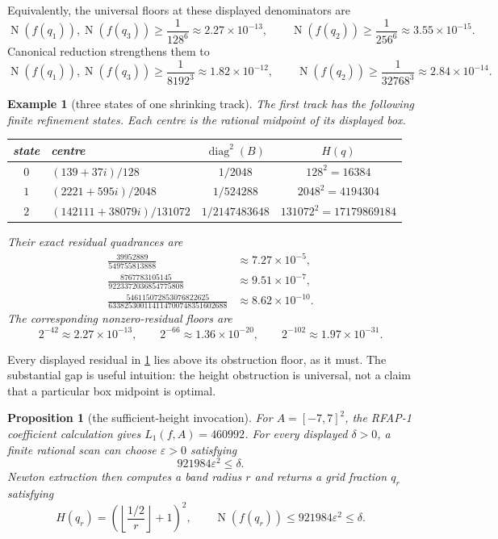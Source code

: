 \documentclass[11pt]{article}
\newtheorem{proposition}[proposition]{Proposition}
\newtheorem{example}[example]{Example}
\newcommand{\Norm}[1]{\operatorname{N}\!\left(#1\right)}
\newcommand{\diamq}{\operatorname{diag}^{2}}
\newcommand{\eps}{\varepsilon}
\begin{document}
Equivalently, the universal floors at these displayed denominators are
\[
 \Norm{f(q_1)},\Norm{f(q_3)}\ge\frac1{128^6}
       \approx2.27\mathbin{\times}10^{-13},
 \qquad
 \Norm{f(q_2)}\ge\frac1{256^6}
       \approx3.55\mathbin{\times}10^{-15}.
\]
Canonical reduction strengthens them to
\[
 \Norm{f(q_1)},\Norm{f(q_3)}\ge\frac1{8192^3}
       \approx1.82\mathbin{\times}10^{-12},
 \qquad
 \Norm{f(q_2)}\ge\frac1{32768^3}
       \approx2.84\mathbin{\times}10^{-14}.
\]

\begin{example}[three states of one shrinking track]
\label{ex:cubic-track}
The first track has the following finite refinement states.  Each centre is
the rational midpoint of its displayed box.

\begin{center}
\small
\begin{tabularx}{\textwidth}{@{}c>{\raggedright\arraybackslash}Xcc@{}}
\toprule
state & centre & $\diamq(B)$ & $H(q)$\\
\midrule
$0$ & $(139+37i)/128$
    & $1/2048$ & $128^2=16384$\\
$1$ & $(2221+595i)/2048$
    & $1/524288$ & $2048^2=4194304$\\
$2$ & $(142111+38079i)/131072$
    & $1/2147483648$ & $131072^2=17179869184$\\
\bottomrule
\end{tabularx}
\end{center}

Their exact residual quadrances are
\[
 \begin{aligned}
 \frac{39952889}{549755813888}
   &\approx7.27\mathbin{\times}10^{-5},\\
 \frac{8767783105145}{9223372036854775808}
   &\approx9.51\mathbin{\times}10^{-7},\\
 \frac{546115072853076822625}{633825300114114700748351602688}
   &\approx8.62\mathbin{\times}10^{-10}.
 \end{aligned}
\]
The corresponding nonzero-residual floors are
\[
 2^{-42}\approx2.27\mathbin{\times}10^{-13},\qquad
 2^{-66}\approx1.36\mathbin{\times}10^{-20},\qquad
 2^{-102}\approx1.97\mathbin{\times}10^{-31}.
\]
\end{example}

Every displayed residual in \cref{ex:cubic-track} lies above its obstruction
floor, as it must.  The substantial gap is useful intuition: the height
obstruction is universal, not a claim that a particular box midpoint is
optimal.

\begin{proposition}[the sufficient-height invocation]
\label{prop:cubic-sufficient}
For $A=[-7,7]^2$, the RFAP-1 coefficient calculation gives
$L_1(f,A)=460992$.  For every displayed $\delta>0$, a finite rational scan
can choose $\eps>0$ satisfying
\[
                          921984\eps^2\le\delta.
\]
Newton extraction then computes a band radius $r$ and returns a grid fraction
$q_r$ satisfying
\[
 H(q_r)=\left(\left\lfloor\frac{1/2}{r}\right\rfloor+1\right)^2,
 \qquad \Norm{f(q_r)}\le921984\eps^2\le\delta.
\]
\end{proposition}
\end{document}
